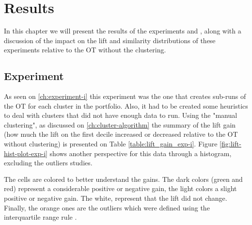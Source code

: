 \chapter{Results}

In this chapter we will present the results of the experiments \nameExperimentI{} and \nameExperimentII{}, along with a discussion of the impact on the lift and similarity distributions of these experiments relative to the OT without the clustering.

\section{Experiment \nameExperimentI}

As seen on \ref{ch:experiment-i} this experiment was the one that creates sub-runs of the OT for each cluster in the portfolio. Also, it had to be created some heuristics to deal with clusters that did not have enough data to run. Using the "manual clustering", as discussed on \ref{ch:cluster-algorithm} the summary of the lift gain (how much the lift on the first decile increased or decreased relative to the OT without clustering) is presented on Table \ref{table:lift_gain_exp-i}. Figure \ref{fig:lift-hist-plot-exp-i} shows another perspective for this data through a histogram, excluding the outliers studies.

The cells are colored to better understand the gains. The dark colors (green and red) represent a considerable positive or negative gain, the light colors a slight positive or negative gain. The white, represent that the lift did not change. Finally, the orange ones are the outliers which were defined using the interquartile range rule \cite{upton1996understanding}. 

